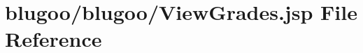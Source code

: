 \hypertarget{ViewGrades_8jsp}{
\section{blugoo/blugoo/ViewGrades.jsp File Reference}
\label{ViewGrades_8jsp}
}


